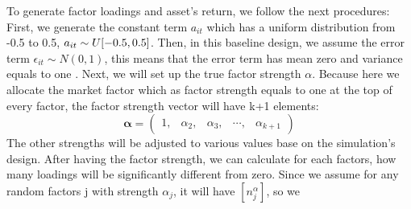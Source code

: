 \documentclass[12pt]{article}
\begin{document}

To generate factor loadings and asset's return, we follow the next procedures:
First, we generate the constant term $a_{it}$ which has a uniform distribution from -0.5 to 0.5, $a_{it} \sim \mathnormal{U}[-0.5,0.5]$.
Then, in this baseline design, we assume the error term $\epsilon_{it}\sim N(0,1)$, this means that the error term has mean zero and variance equals to one .
Next, we will set up the true factor strength $\alpha$.
Because here we allocate the market factor which as factor strength equals to one at the top of every factor, the factor strength vector will have k+1 elements:
\[  \mathbf{\alpha} = \begin{pmatrix}
1,&\alpha_2,&\alpha_3,&\cdots,&\alpha_{k+1}
\end{pmatrix}  \]
The other strengths will be adjusted to various values base on the simulation's design.
After having the factor strength, we can calculate for each factors, how many loadings will be significantly different from zero.
Since we assume for any random factors j with strength $\alpha_j$, it will have $[n^\alpha_j]$, so we 
\end{document}
